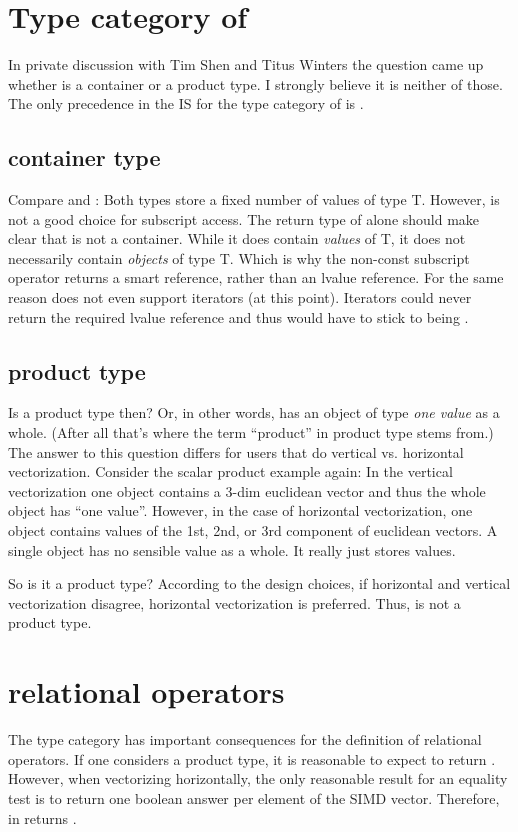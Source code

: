 \section{Type category of }
In private discussion with Tim Shen and Titus Winters the question came up whether \simd[<T>] is a container or a product type.
I strongly believe it is neither of those.
The only precedence in the IS for the type category of \simdT is .

\subsection{container type}
Compare \simdT and :
Both types store a fixed number of values of type \type T.
However, \simdT is not a good choice for subscript access.
The return type of  alone should make clear that \simdT is not a container.
While it does contain \emph{values} of \type T, it does not necessarily contain \emph{objects} of type \type T.
Which is why the non-const subscript operator returns a smart reference, rather than an lvalue reference.
For the same reason \simdT does not even support iterators (at this point).
Iterators could never return the required lvalue reference and thus would have to stick to being .

\subsection{product type}
Is \simdT a product type then?
Or, in other words, has an object of type \simdT \emph{one value} as a whole.
(After all that's where the term “product” in product type stems from.)
The answer to this question differs for users that do vertical vs. horizontal vectorization.
Consider the scalar product example again:
In the vertical vectorization one \simdT object contains a 3-dim euclidean vector and thus the whole \simdT object has “one value”.
However, in the case of horizontal vectorization, one \simdT object contains  values of the 1st, 2nd, or 3rd component of  euclidean vectors.
A single \simdT object has no sensible value as a whole.
It really just stores  values.

So is it a product type?
According to the design choices, if horizontal and vertical vectorization disagree, horizontal vectorization is preferred.
Thus, \simdT is not a product type.

\section{relational operators}
The type category has important consequences for the definition of relational operators.
If one considers \simdT a product type, it is reasonable to expect  to return \bool.
However, when vectorizing horizontally, the only reasonable result for an equality test is to return one boolean answer per element of the SIMD vector.
Therefore, \simdT in \parencite{P0214R6} returns \maskT.


